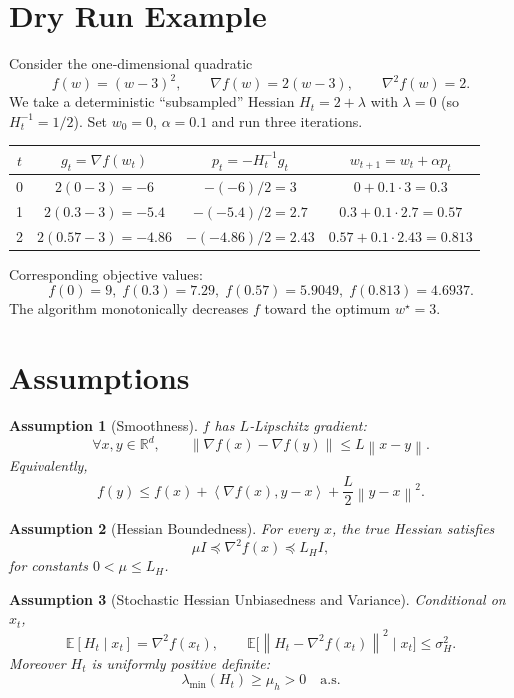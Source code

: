 \documentclass{article}
\newtheorem{assumption}{Assumption}
\newcommand{\E}{\mathbb{E}}
\newcommand{\R}{\mathbb{R}}
\newcommand{\norm}[1]{\left\|#1\right\|}
\newcommand{\inner}[1]{\left\langle #1 \right\rangle}
\begin{document}
\section*{Dry Run Example}
Consider the one‑dimensional quadratic
\[
f(w)=(w-3)^2,\qquad \nabla f(w)=2(w-3),\qquad \nabla^{2}f(w)=2.
\]
We take a deterministic “subsampled” Hessian $H_t=2+\lambda$ with $\lambda=0$ (so $H_t^{-1}=1/2$).  
Set $w_0=0$, $\alpha=0.1$ and run three iterations.

\begin{center}
\begin{tabular}{c|c|c|c}
$t$ & $g_t= \nabla f(w_t)$ & $p_t=-H_t^{-1}g_t$ & $w_{t+1}=w_t+\alpha p_t$ \\ \hline
0 & $2(0-3)=-6$ & $-(-6)/2=3$ & $0+0.1\cdot 3=0.3$ \\
1 & $2(0.3-3)=-5.4$ & $-(-5.4)/2=2.7$ & $0.3+0.1\cdot 2.7=0.57$ \\
2 & $2(0.57-3)=-4.86$ & $-(-4.86)/2=2.43$ & $0.57+0.1\cdot 2.43=0.813$ 
\end{tabular}
\end{center}
Corresponding objective values:
\[
f(0)=9,\; f(0.3)=7.29,\; f(0.57)=5.9049,\; f(0.813)=4.6937.
\]
The algorithm monotonically decreases $f$ toward the optimum $w^{\star}=3$.

\newpage
\section*{Assumptions}
\begin{assumption}[Smoothness]\label{ass:smooth}
$f$ has $L$‑Lipschitz gradient:
\[
\forall x,y\in\R^{d},\qquad 
\norm{\nabla f(x)-\nabla f(y)}\le L\norm{x-y}.
\]
Equivalently,
\[
f(y)\le f(x)+\inner{\nabla f(x),y-x}+\frac{L}{2}\norm{y-x}^{2}.
\tag{2}
\]
\end{assumption}

\begin{assumption}[Hessian Boundedness]\label{ass:hessian}
For every $x$, the true Hessian satisfies
\[
\mu I \preceq \nabla^{2}f(x) \preceq L_{H} I,
\]
for constants $0<\mu\le L_{H}$.
\end{assumption}

\begin{assumption}[Stochastic Hessian Unbiasedness and Variance]\label{ass:unbiased}
Conditional on $x_t$,
\[
\E[H_t\mid x_t]=\nabla^{2}f(x_t),\qquad
\E\bigl[\norm{H_t-\nabla^{2}f(x_t)}^{2}\mid x_t\bigr]\le \sigma_{H}^{2}.
\tag{3}
\]
Moreover $H_t$ is uniformly positive definite:
\[
\lambda_{\min}(H_t)\ge \mu_{\!h}>0\quad\text{a.s.}
\tag{4}
\]
\end{assumption}
\end{document}

